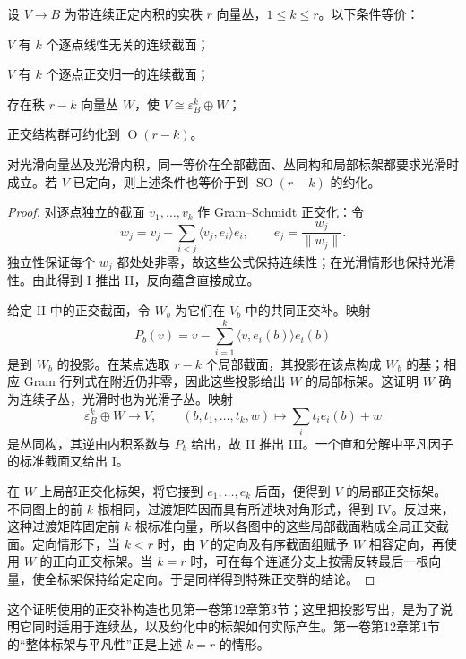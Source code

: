 \begin{proposition}\label{g2:prop:sections-orthogonal-reduction}
	设 \(V\rightarrow B\) 为带连续正定内积的实秩 \(r\) 向量丛，\(1\le k\le r\)。以下条件等价：
	\begin{equivalences}
		\item \(V\) 有 \(k\) 个逐点线性无关的连续截面；
		\item \(V\) 有 \(k\) 个逐点正交归一的连续截面；
		\item 存在秩 \(r-k\) 向量丛 \(W\)，使 \(V\cong\varepsilon_B^k\oplus W\)；
		\item 正交结构群可约化到 \(\operatorname O(r-k)\)。
	\end{equivalences}
	对光滑向量丛及光滑内积，同一等价在全部截面、丛同构和局部标架都要求光滑时成立。若 \(V\) 已定向，则上述条件也等价于到 \(\operatorname{SO}(r-k)\) 的约化。
\end{proposition}
\begin{proof}
	对逐点独立的截面 \(v_1,\ldots,v_k\) 作 Gram--Schmidt 正交化：令
	\[
		w_j=v_j-\sum_{i<j}\langle v_j,e_i\rangle e_i,\qquad e_j=\frac{w_j}{\|w_j\|}.
	\]
	独立性保证每个 \(w_j\) 都处处非零，故这些公式保持连续性；在光滑情形也保持光滑性。由此得到 I 推出 II，反向蕴含直接成立。

	给定 II 中的正交截面，令 \(W_b\) 为它们在 \(V_b\) 中的共同正交补。映射
	\[
		P_b(v)=v-\sum_{i=1}^k\langle v,e_i(b)\rangle e_i(b)
	\]
	是到 \(W_b\) 的投影。在某点选取 \(r-k\) 个局部截面，其投影在该点构成 \(W_b\) 的基；相应 Gram 行列式在附近仍非零，因此这些投影给出 \(W\) 的局部标架。这证明 \(W\) 确为连续子丛，光滑时也为光滑子丛。映射
	\[
		\varepsilon_B^k\oplus W\longrightarrow V,\qquad (b,t_1,\ldots,t_k,w)\longmapsto\sum_i t_i e_i(b)+w
	\]
	是丛同构，其逆由内积系数与 \(P_b\) 给出，故 II 推出 III。一个直和分解中平凡因子的标准截面又给出 I。

	在 \(W\) 上局部正交化标架，将它接到 \(e_1,\ldots,e_k\) 后面，便得到 \(V\) 的局部正交标架。不同图上的前 \(k\) 根相同，过渡矩阵因而具有所述块对角形式，得到 IV。反过来，这种过渡矩阵固定前 \(k\) 根标准向量，所以各图中的这些局部截面粘成全局正交截面。定向情形下，当 \(k<r\) 时，由 \(V\) 的定向及有序截面组赋予 \(W\) 相容定向，再使用 \(W\) 的正向正交标架。当 \(k=r\) 时，可在每个连通分支上按需反转最后一根向量，使全标架保持给定定向。于是同样得到特殊正交群的结论。
\end{proof}

这个证明使用的正交补构造也见第一卷第12章第3节；这里把投影写出，是为了说明它同时适用于连续丛，以及约化中的标架如何实际产生。第一卷第12章第1节的“整体标架与平凡性”正是上述 \(k=r\) 的情形。

